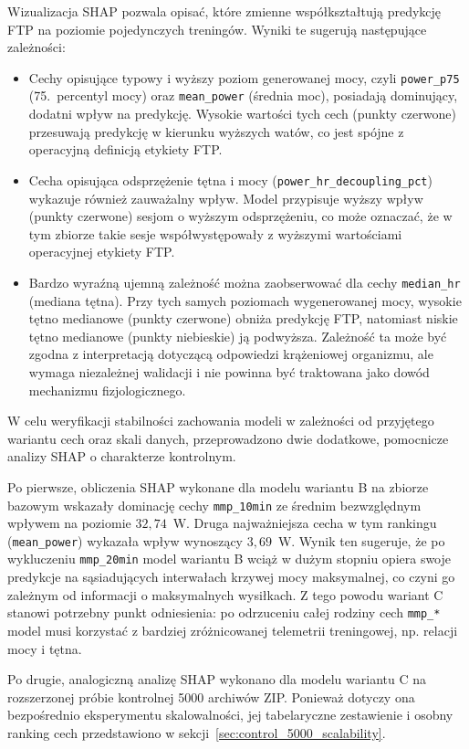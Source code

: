 Wizualizacja SHAP pozwala opisać, które zmienne współkształtują predykcję FTP na poziomie pojedynczych treningów. Wyniki te sugerują następujące zależności:
\begin{itemize}
  \item Cechy opisujące typowy i wyższy poziom generowanej mocy, czyli \texttt{power\_p75} (75.\ percentyl mocy) oraz \texttt{mean\_power} (średnia moc), posiadają dominujący, dodatni wpływ na predykcję. Wysokie wartości tych cech (punkty czerwone) przesuwają predykcję w kierunku wyższych watów, co jest spójne z operacyjną definicją etykiety FTP.
  \item Cecha opisująca odsprzężenie tętna i mocy (\texttt{power\_hr\_decoupling\_pct}) wykazuje również zauważalny wpływ. Model przypisuje wyższy wpływ (punkty czerwone) sesjom o wyższym odsprzężeniu, co może oznaczać, że w tym zbiorze takie sesje współwystępowały z wyższymi wartościami operacyjnej etykiety FTP.
  \item Bardzo wyraźną ujemną zależność można zaobserwować dla cechy \texttt{median\_hr} (mediana tętna). Przy tych samych poziomach wygenerowanej mocy, wysokie tętno medianowe (punkty czerwone) obniża predykcję FTP, natomiast niskie tętno medianowe (punkty niebieskie) ją podwyższa. Zależność ta może być zgodna z interpretacją dotyczącą odpowiedzi krążeniowej organizmu, ale wymaga niezależnej walidacji i nie powinna być traktowana jako dowód mechanizmu fizjologicznego.
\end{itemize}

W celu weryfikacji stabilności zachowania modeli w zależności od przyjętego wariantu cech oraz skali danych, przeprowadzono dwie dodatkowe, pomocnicze analizy SHAP o charakterze kontrolnym.

Po pierwsze, obliczenia SHAP wykonane dla modelu wariantu B na zbiorze bazowym wskazały dominację cechy \texttt{mmp\_10min} ze średnim bezwzględnym wpływem na poziomie $32{,}74$~W. Druga najważniejsza cecha w tym rankingu (\texttt{mean\_power}) wykazała wpływ wynoszący $3{,}69$~W. Wynik ten sugeruje, że po wykluczeniu \texttt{mmp\_20min} model wariantu B wciąż w dużym stopniu opiera swoje predykcje na sąsiadujących interwałach krzywej mocy maksymalnej, co czyni go zależnym od informacji o maksymalnych wysiłkach. Z tego powodu wariant C stanowi potrzebny punkt odniesienia: po odrzuceniu całej rodziny cech \texttt{mmp\_*} model musi korzystać z bardziej zróżnicowanej telemetrii treningowej, np. relacji mocy i tętna.

Po drugie, analogiczną analizę SHAP wykonano dla modelu wariantu C na rozszerzonej próbie kontrolnej 5000 archiwów ZIP. Ponieważ dotyczy ona bezpośrednio eksperymentu skalowalności, jej tabelaryczne zestawienie i osobny ranking cech przedstawiono w sekcji~\ref{sec:control_5000_scalability}.

